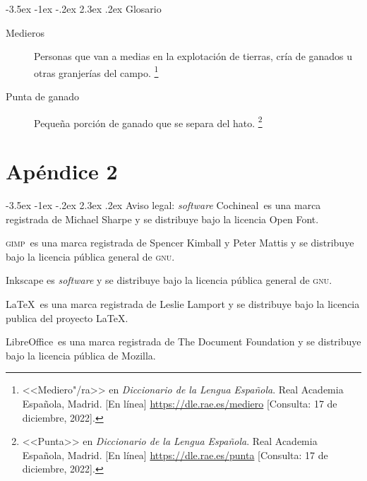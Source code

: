\documentclass[14pt,twoside,final]{extbook} %
\makeatletter
\let\oldfootnote\footnote
\renewcommand\footnote[1]{%
\oldfootnote{\hspace{1mm}#1}}
\renewcommand\section{\@startsection {section}{1}{\z@}%
                                     {-3.5ex \@plus -1ex \@minus -.2ex}%
                                     {2.3ex \@plus .2ex}%
                                     {\normalfont\large\bfseries\sc}}
\makeatother
\begin{document}
\section{Glosario}\label{sec:glosario}
\begin{description}
\item[Medieros]Personas que van a medias en la explotación de tierras, cría de ganados u otras granjerías del campo.\footnote{<<Mediero"/ra>> en \emph{Diccionario de la Lengua Española}. Real Academia Española, Madrid. [En línea] \url{https://dle.rae.es/mediero} [Consulta: 17 de diciembre, 2022].}
\item[Punta de ganado]Pequeña porción de ganado que se separa del hato.\footnote{<<Punta>> en \emph{Diccionario de la Lengua Española}. Real Academia Española, Madrid. [En línea] \url{https://dle.rae.es/punta} [Consulta: 17 de diciembre, 2022].}

\end{description}
\chapter{Apéndice 2}\label{ap:apendice-dos}
\thispagestyle{empty}
\pagestyle{fancy}
\fancyhf{} %
\fancyhead[RO,LE]{\thepage}
\renewcommand{\headrulewidth}{0pt}
\setcounter{page}{139}
\section{Aviso legal: \emph{software}}\label{sec:aviso-legal-software}
Cochineal\texttrademark\ es una marca registrada de Michael Sharpe y se distribuye bajo la licencia Open Font.

\textsc{gimp}\texttrademark\ es una marca registrada de Spencer Kimball y Peter Mattis y se distribuye bajo la licencia pública general de \textsc{gnu}.

Inkscape es \emph{software} y se distribuye bajo la licencia pública general de \textsc{gnu}.

\LaTeX\texttrademark\ es una marca registrada de Leslie Lamport y se distribuye bajo la licencia publica del proyecto \LaTeX{}.

LibreOffice\texttrademark\ es una marca registrada de The Document Foundation y se distribuye bajo la licencia pública de Mozilla.
\end{document}
